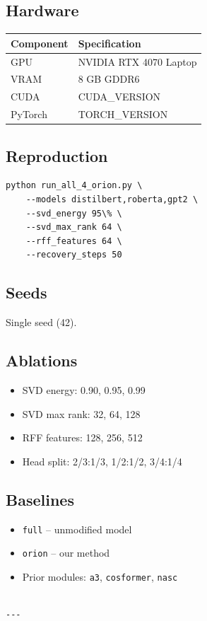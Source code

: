 \subsection{Hardware}

\begin{table}[H]
\centering
\small
\begin{tabular}{ll}
\toprule
\textbf{Component} & \textbf{Specification} \\
\midrule
GPU & NVIDIA RTX 4070 Laptop \\
VRAM & 8 GB GDDR6 \\
CUDA & {{CUDA\_VERSION}} \\
PyTorch & {{TORCH\_VERSION}} \\
\bottomrule
\end{tabular}
\end{table}

\subsection{Reproduction}

\begin{lstlisting}
python run_all_4_orion.py \
    --models distilbert,roberta,gpt2 \
    --svd_energy 95\% \
    --svd_max_rank 64 \
    --rff_features 64 \
    --recovery_steps 50
\end{lstlisting}

\subsection{Seeds}

Single seed (42).

\subsection{Ablations}

\begin{itemize}
\item SVD energy: 0.90, 0.95, 0.99
\item SVD max rank: 32, 64, 128
\item RFF features: 128, 256, 512
\item Head split: 2/3:1/3, 1/2:1/2, 3/4:1/4

\end{itemize}
\subsection{Baselines}

\begin{itemize}
\item \texttt{full} -- unmodified model
\item \texttt{orion} -- our method
\item Prior modules: \texttt{a3}, \texttt{cosformer}, \texttt{nasc}
\end{itemize}
\begin{lstlisting}

---
\end{lstlisting}